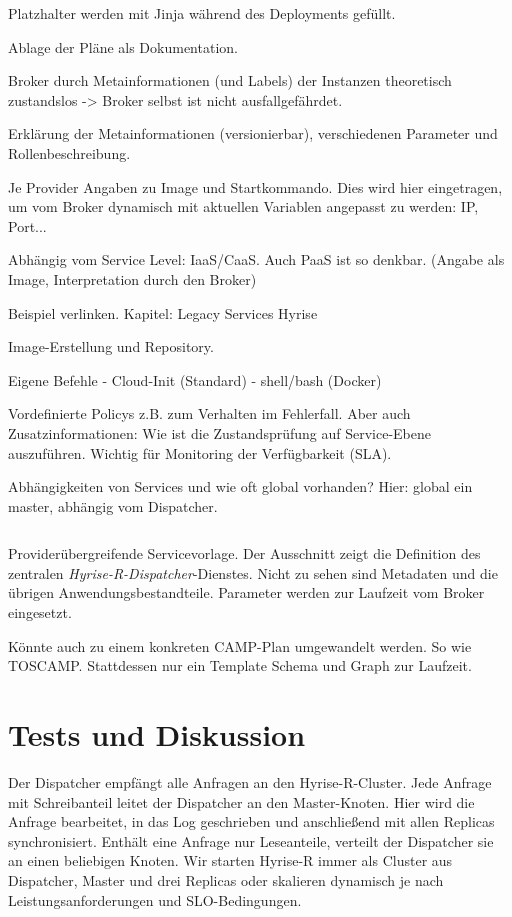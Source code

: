 Platzhalter werden mit Jinja während des Deployments gefüllt.

Ablage der Pläne als Dokumentation.

Broker durch Metainformationen (und Labels) der Instanzen theoretisch zustandslos -> Broker selbst ist nicht ausfallgefährdet.

Erklärung der Metainformationen (versionierbar), verschiedenen Parameter und Rollenbeschreibung.

Je Provider Angaben zu Image und Startkommando. Dies wird hier eingetragen, um vom Broker dynamisch mit aktuellen Variablen angepasst zu werden: IP, Port...

Abhängig vom Service Level: IaaS/CaaS. Auch PaaS ist so denkbar. (Angabe als Image, Interpretation durch den Broker)

Beispiel verlinken.
Kapitel: Legacy Services Hyrise

Image-Erstellung und Repository.

Eigene Befehle
- Cloud-Init (Standard)
- shell/bash (Docker)

Vordefinierte Policys z.B. zum Verhalten im Fehlerfall. Aber auch Zusatzinformationen: Wie ist die Zustandsprüfung auf Service-Ebene auszuführen. Wichtig für Monitoring der Verfügbarkeit (SLA).

Abhängigkeiten von Services und wie oft global vorhanden? Hier: global ein master, abhängig vom Dispatcher.


\begin{listing}[ht]	
	\inputminted[firstline=15]{yaml}{./src/hyrise-r.sample.yaml}
	\caption{Providerübergreifende Servicevorlage. Der Ausschnitt zeigt die Definition des zentralen \emph{Hyrise-R-Dispatcher}-Dienstes. Nicht zu sehen sind Metadaten und die übrigen Anwendungsbestandteile. Parameter werden zur Laufzeit vom Broker eingesetzt.}
	\label{listing:hyrise-r}
\end{listing}

Könnte auch zu einem konkreten CAMP-Plan umgewandelt werden. So wie TOSCAMP. Stattdessen nur ein Template Schema und Graph zur Laufzeit.


\section{Tests und Diskussion}

Der Dispatcher empfängt alle Anfragen an den Hyrise-R-Cluster. Jede Anfrage mit Schreibanteil leitet der Dispatcher an den Master-Knoten. Hier wird die Anfrage bearbeitet, in das Log geschrieben und anschließend mit allen Replicas synchronisiert. Enthält eine Anfrage nur Leseanteile, verteilt der Dispatcher sie an einen beliebigen Knoten.
Wir starten Hyrise-R immer als Cluster aus Dispatcher, Master und drei Replicas oder skalieren dynamisch je nach Leistungsanforderungen und SLO-Bedingungen.

